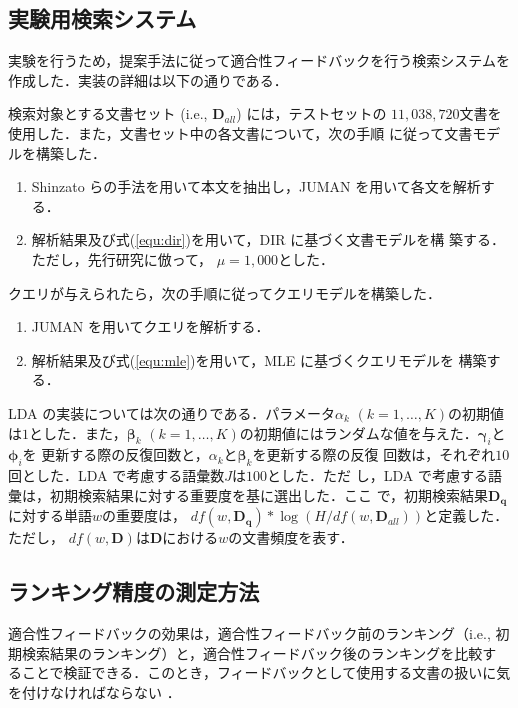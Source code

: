 \documentclass[japanese]{jnlp_1.4}
\begin{document}
\subsection{実験用検索システム}

実験を行うため，提案手法に従って適合性フィードバックを行う検索システムを
作成した．実装の詳細は以下の通りである．

検索対象とする文書セット (i.e., $\bm{D}_{all}$) には，テストセットの
$11,038,720$文書を使用した．また，文書セット中の各文書について，次の手順
に従って文書モデルを構築した．
\begin{enumerate}
 \item Shinzato らの手法\cite{Shinzato2008}を用いて本文を抽出し，JUMAN
       \cite{Kurohashi1994}を用いて各文を解析する．
 \item 解析結果及び式(\ref{equ:dir})を用いて，DIR に基づく文書モデルを構
       築する．ただし，先行研究\cite{Zhai2001,Wei2006,Yi2009}に倣って，
       $\mu = 1,000$とした．
\end{enumerate}

クエリが与えられたら，次の手順に従ってクエリモデルを構築した．
\begin{enumerate}
 \item JUMAN を用いてクエリを解析する．
 \item 解析結果及び式(\ref{equ:mle})を用いて，MLE に基づくクエリモデルを
       構築する．
\end{enumerate}

LDA の実装については次の通りである．パラメータ$\alpha_{k}$ $(k = 1,
\dots, K)$の初期値は$1$とした．また，$\bm{\beta}_{k}$ $(k = 1, \dots,
K)$の初期値にはランダムな値を与えた．$\bm{\gamma}_{i}$と$\bm{\phi}_{i}$を
更新する際の反復回数と，$\alpha_{k}$と$\bm{\beta}_{k}$を更新する際の反復
回数は，それぞれ$10$回とした．LDA で考慮する語彙数$J$は$100$とした．ただ
し，LDA で考慮する語彙は，初期検索結果に対する重要度を基に選出した．ここ
で，初期検索結果$\bm{D}_{\bm{q}}$に対する単語$w$の重要度は，
$df(w,\bm{D}_{\bm{q}}) * \log(H / df(w,\bm{D}_{all}))$と定義した．ただし，
$df(w, \bm{D})$は$\bm{D}$における$w$の文書頻度を表す．



\subsection{ランキング精度の測定方法} \label{ssec:evaluation_method}

適合性フィードバックの効果は，適合性フィードバック前のランキング（i.e.,
初期検索結果のランキング）と，適合性フィードバック後のランキングを比較す
ることで検証できる．このとき，フィードバックとして使用する文書の扱いに気
を付けなければならない \cite{Hull1993}．
\end{document}
